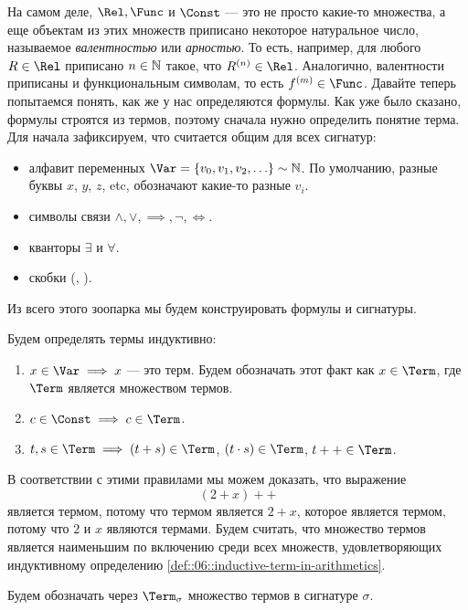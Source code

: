 На самом деле, $\Rel, \Func$ и $\Const$ --- это не просто какие-то множества, а еще объектам из этих множеств приписано некоторое натуральное число, называемое {\it валентностью} или {\it арностью}.
То есть, например, для любого $R \in \Rel$ приписано $n \in \mathbb{N}$ такое, что $R^{(n)} \in \Rel$.
Аналогично, валентности приписаны и функциональным символам, то есть $f^{(m)} \in \Func$.
Давайте теперь попытаемся понять, как же у нас определяются формулы.
Как уже было сказано, формулы строятся из термов, поэтому сначала нужно определить понятие терма.
Для начала зафиксируем, что считается общим для всех сигнатур:
\begin{itemize}
    \item алфавит переменных $\Var = \left\{v_{0}, v_{1}, v_{2}, \ldots\right\} \sim \N$.
    По умолчанию, разные буквы $x$, $y$, $z$, etc, обозначают какие-то разные $v_{i}$.
    \item символы связи $\land, \lor, \implies, \neg, \iff$.
    \item кванторы $\exists$ и $\forall$.
    \item скобки (, ). 
\end{itemize}
Из всего этого зоопарка мы будем конструировать формулы и сигнатуры.

\begin{definition} \label{def::06::inductive-term-in-arithmetics}
    Будем определять термы индуктивно:
    \begin{enumerate}
        \item $x \in \Var \implies x$ --- это терм.
        Будем обозначать этот факт как $x \in \Term$, где $\Term$ является множеством термов.
        \item $c \in \Const \implies c \in \Term$.
        \item $t, s \in \Term \implies (t + s) \in \Term$, $(t \cdot s) \in \Term$, $t++ \in \Term$.
    \end{enumerate}
\end{definition}

В соответствии с этими правилами мы можем доказать, что выражение
$$
    (2 + x)++
$$
является термом, потому что термом является $2 + x$, которое является термом, потому что $2$ и $x$ являются термами.
Будем считать, что множество термов является наименьшим по включению среди всех множеств, удовлетворяющих индуктивному определению \ref{def::06::inductive-term-in-arithmetics}.

\begin{definition}
    Будем обозначать через $\Term_{\sigma}$ множество термов в сигнатуре $\sigma$.
\end{definition}

